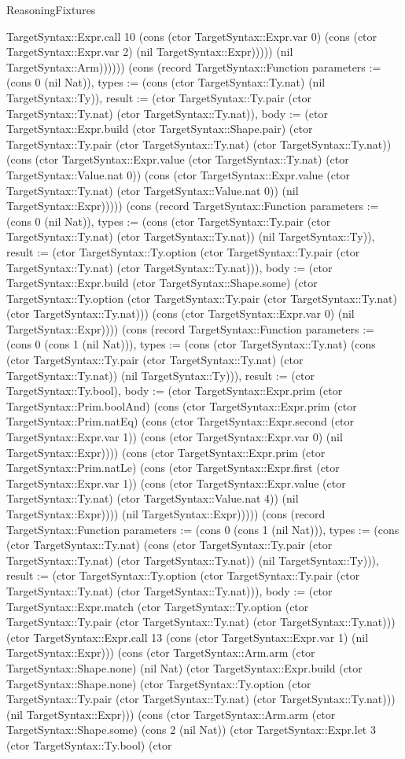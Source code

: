 \begin{lexlean}{ReasoningFixtures}
\begin{semanticmodule}
{TargetSyntax::Expr.call 10 (cons (ctor TargetSyntax::Expr.var 0) (cons (ctor TargetSyntax::Expr.var 2) (nil TargetSyntax::Expr))))) (nil TargetSyntax::Arm)))))}) (cons (record TargetSyntax::Function {parameters := (cons 0 (nil Nat)), types := (cons (ctor TargetSyntax::Ty.nat) (nil TargetSyntax::Ty)), result := (ctor TargetSyntax::Ty.pair (ctor TargetSyntax::Ty.nat) (ctor TargetSyntax::Ty.nat)), body := (ctor TargetSyntax::Expr.build (ctor TargetSyntax::Shape.pair) (ctor TargetSyntax::Ty.pair (ctor TargetSyntax::Ty.nat) (ctor TargetSyntax::Ty.nat)) (cons (ctor TargetSyntax::Expr.value (ctor TargetSyntax::Ty.nat) (ctor TargetSyntax::Value.nat 0)) (cons (ctor TargetSyntax::Expr.value (ctor TargetSyntax::Ty.nat) (ctor TargetSyntax::Value.nat 0)) (nil TargetSyntax::Expr))))}) (cons (record TargetSyntax::Function {parameters := (cons 0 (nil Nat)), types := (cons (ctor TargetSyntax::Ty.pair (ctor TargetSyntax::Ty.nat) (ctor TargetSyntax::Ty.nat)) (nil TargetSyntax::Ty)), result := (ctor TargetSyntax::Ty.option (ctor TargetSyntax::Ty.pair (ctor TargetSyntax::Ty.nat) (ctor TargetSyntax::Ty.nat))), body := (ctor TargetSyntax::Expr.build (ctor TargetSyntax::Shape.some) (ctor TargetSyntax::Ty.option (ctor TargetSyntax::Ty.pair (ctor TargetSyntax::Ty.nat) (ctor TargetSyntax::Ty.nat))) (cons (ctor TargetSyntax::Expr.var 0) (nil TargetSyntax::Expr)))}) (cons (record TargetSyntax::Function {parameters := (cons 0 (cons 1 (nil Nat))), types := (cons (ctor TargetSyntax::Ty.nat) (cons (ctor TargetSyntax::Ty.pair (ctor TargetSyntax::Ty.nat) (ctor TargetSyntax::Ty.nat)) (nil TargetSyntax::Ty))), result := (ctor TargetSyntax::Ty.bool), body := (ctor TargetSyntax::Expr.prim (ctor TargetSyntax::Prim.boolAnd) (cons (ctor TargetSyntax::Expr.prim (ctor TargetSyntax::Prim.natEq) (cons (ctor TargetSyntax::Expr.second (ctor TargetSyntax::Expr.var 1)) (cons (ctor TargetSyntax::Expr.var 0) (nil TargetSyntax::Expr)))) (cons (ctor TargetSyntax::Expr.prim (ctor TargetSyntax::Prim.natLe) (cons (ctor TargetSyntax::Expr.first (ctor TargetSyntax::Expr.var 1)) (cons (ctor TargetSyntax::Expr.value (ctor TargetSyntax::Ty.nat) (ctor TargetSyntax::Value.nat 4)) (nil TargetSyntax::Expr)))) (nil TargetSyntax::Expr))))}) (cons (record TargetSyntax::Function {parameters := (cons 0 (cons 1 (nil Nat))), types := (cons (ctor TargetSyntax::Ty.nat) (cons (ctor TargetSyntax::Ty.pair (ctor TargetSyntax::Ty.nat) (ctor TargetSyntax::Ty.nat)) (nil TargetSyntax::Ty))), result := (ctor TargetSyntax::Ty.option (ctor TargetSyntax::Ty.pair (ctor TargetSyntax::Ty.nat) (ctor TargetSyntax::Ty.nat))), body := (ctor TargetSyntax::Expr.match (ctor TargetSyntax::Ty.option (ctor TargetSyntax::Ty.pair (ctor TargetSyntax::Ty.nat) (ctor TargetSyntax::Ty.nat))) (ctor TargetSyntax::Expr.call 13 (cons (ctor TargetSyntax::Expr.var 1) (nil TargetSyntax::Expr))) (cons (ctor TargetSyntax::Arm.arm (ctor TargetSyntax::Shape.none) (nil Nat) (ctor TargetSyntax::Expr.build (ctor TargetSyntax::Shape.none) (ctor TargetSyntax::Ty.option (ctor TargetSyntax::Ty.pair (ctor TargetSyntax::Ty.nat) (ctor TargetSyntax::Ty.nat))) (nil TargetSyntax::Expr))) (cons (ctor TargetSyntax::Arm.arm (ctor TargetSyntax::Shape.some) (cons 2 (nil Nat)) (ctor TargetSyntax::Expr.let 3 (ctor TargetSyntax::Ty.bool) (ctor }
\end{semanticmodule}
\end{lexlean}
